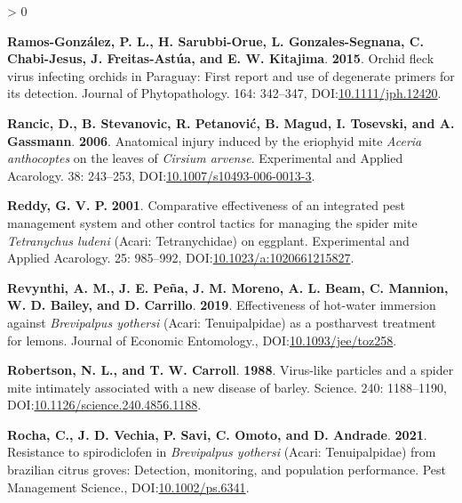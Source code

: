 \documentclass{ufdissertation}[overrideChapters] %
\newlength{\cslhangindent}
\newenvironment{CSLReferences}[2] %
 {%
  \setlength{\parindent}{0pt}
  \ifodd #1 \everypar{\setlength{\hangindent}{\cslhangindent}}\ignorespaces\fi
  \ifnum #2 > 0
  \setlength{\parskip}{#2\baselineskip}
  \fi
 }%
 {}
\begin{document}
{\begin{CSLReferences}{1}{1}
\leavevmode{}%
\textbf{Ramos-González, P. L., H. Sarubbi-Orue, L. Gonzales-Segnana, C. Chabi-Jesus, J. Freitas-Astúa, and E. W. Kitajima}. \textbf{2015}. {Orchid fleck virus} infecting orchids in {Paraguay}: First report and use of degenerate primers for its detection. Journal of Phytopathology. 164: 342--347, DOI:\href{https://doi.org/10.1111/jph.12420}{10.1111/jph.12420}.

\leavevmode{}%
\textbf{Rancic, D., B. Stevanovic, R. Petanović, B. Magud, I. Tosevski, and A. Gassmann}. \textbf{2006}. Anatomical injury induced by the eriophyid mite {\emph{Aceria anthocoptes}} on the leaves of {\emph{Cirsium arvense}}. Experimental and Applied Acarology. 38: 243--253, DOI:\href{https://doi.org/10.1007/s10493-006-0013-3}{10.1007/s10493-006-0013-3}.

\leavevmode{}%
\textbf{Reddy, G. V. P.} \textbf{2001}. Comparative effectiveness of an integrated pest management system and other control tactics for managing the spider mite {\emph{Tetranychus ludeni}} {(Acari: Tetranychidae)} on eggplant. Experimental and Applied Acarology. 25: 985--992, DOI:\href{https://doi.org/10.1023/a:1020661215827}{10.1023/a:1020661215827}.

\leavevmode{}%
\textbf{Revynthi, A. M., J. E. Peña, J. M. Moreno, A. L. Beam, C. Mannion, W. D. Bailey, and D. Carrillo}. \textbf{2019}. Effectiveness of hot-water immersion against {\emph{Brevipalpus yothersi}} ({Acari}: {Tenuipalpidae}) as a postharvest treatment for lemons. Journal of Economic Entomology., DOI:\href{https://doi.org/10.1093/jee/toz258}{10.1093/jee/toz258}.

\leavevmode{}%
\textbf{Robertson, N. L., and T. W. Carroll}. \textbf{1988}. Virus-like particles and a spider mite intimately associated with a new disease of barley. Science. 240: 1188--1190, DOI:\href{https://doi.org/10.1126/science.240.4856.1188}{10.1126/science.240.4856.1188}.

\leavevmode{}%
\textbf{Rocha, C., J. D. Vechia, P. Savi, C. Omoto, and D. Andrade}. \textbf{2021}. Resistance to spirodiclofen in {\emph{Brevipalpus yothersi}} ({Acari}: {Tenuipalpidae}) from brazilian citrus groves: Detection, monitoring, and population performance. Pest Management Science., DOI:\href{https://doi.org/10.1002/ps.6341}{10.1002/ps.6341}.


\end{CSLReferences}}
\end{document}
